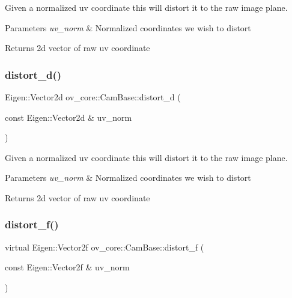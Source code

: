 Given a normalized uv coordinate this will distort it to the raw image plane. 


\begin{DoxyParams}{Parameters}
{\em uv\+\_\+norm} & Normalized coordinates we wish to distort \\
\hline
\end{DoxyParams}
\begin{DoxyReturn}{Returns}
2d vector of raw uv coordinate 
\end{DoxyReturn}
\mbox{\label{classov__core_1_1CamBase_acf981dbc008c5929bf32ddde80b04caf}} 
\subsubsection{\texorpdfstring{distort\+\_\+d()}{distort\_d()}}
{\footnotesize\ttfamily Eigen\+::\+Vector2d ov\+\_\+core\+::\+Cam\+Base\+::distort\+\_\+d (\begin{DoxyParamCaption}\item[{const Eigen\+::\+Vector2d \&}]{uv\+\_\+norm }\end{DoxyParamCaption})\hspace{0.3cm}{\ttfamily [inline]}}



Given a normalized uv coordinate this will distort it to the raw image plane. 


\begin{DoxyParams}{Parameters}
{\em uv\+\_\+norm} & Normalized coordinates we wish to distort \\
\hline
\end{DoxyParams}
\begin{DoxyReturn}{Returns}
2d vector of raw uv coordinate 
\end{DoxyReturn}
\mbox{\label{classov__core_1_1CamBase_a00902793219107474dc21f762fb14556}} 
\subsubsection{\texorpdfstring{distort\+\_\+f()}{distort\_f()}}
{\footnotesize\ttfamily virtual Eigen\+::\+Vector2f ov\+\_\+core\+::\+Cam\+Base\+::distort\+\_\+f (\begin{DoxyParamCaption}\item[{const Eigen\+::\+Vector2f \&}]{uv\+\_\+norm }\end{DoxyParamCaption})\hspace{0.3cm}{\ttfamily [pure virtual]}}



